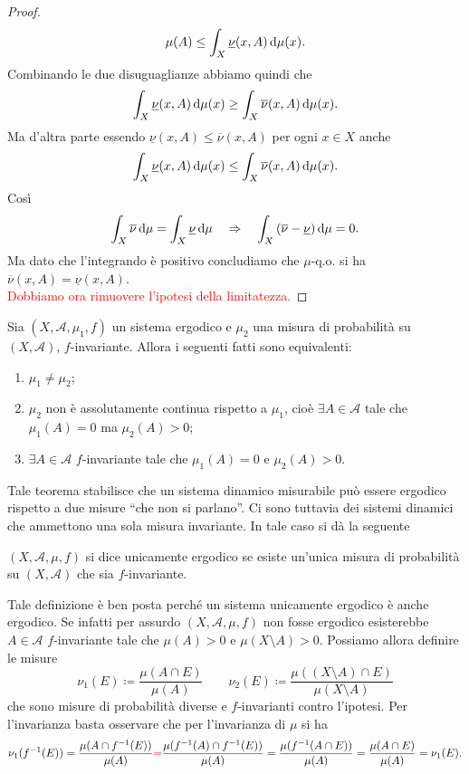 \begin{proof}
    \[
        \mu(A) \leq \int_{X}\underline{\nu}(x, A) \dif{\mu}(x).
    \]
    Combinando le due disuguaglianze abbiamo quindi che
    \[
        \int_{X}\underline{\nu}(x, A) \dif{\mu}(x) \geq \int_{X}\overline{\nu}(x, A) \dif{\mu}(x).
    \]
    Ma d'altra parte essendo $ \underline{\nu}(x, A) \leq \overline{\nu}(x, A) $ per ogni $ x \in X $ anche
    \[
        \int_{X}\underline{\nu}(x, A) \dif{\mu}(x) \leq \int_{X}\overline{\nu}(x, A) \dif{\mu}(x).
    \]
    Così
    \[
        \int_{X} \overline{\nu} \dif{\mu} = \int_{X} \underline{\nu} \dif{\mu} \quad \Rightarrow \quad \int_{X} \left(\overline{\nu} - \underline{\nu}\right) \dif{\mu} = 0.
    \]
    Ma dato che l'integrando è positivo concludiamo che $ \mu $-q.o. si ha $ \overline{\nu}(x, A) = \underline{\nu}(x, A) $. \\
    \textcolor{red}{Dobbiamo ora rimuovere l'ipotesi della limitatezza.}
\end{proof}

\begin{proposition}
    Sia $ (X, \mathcal{A}, \mu_1, f) $ un sistema ergodico e $ \mu_2 $ una misura di probabilità su $ (X, \mathcal{A}) $, $ f $-invariante. Allora i seguenti fatti sono equivalenti:
    \begin{enumerate}[label=(\roman*)]
        \item $ \mu_1 \neq \mu_2 $;
        \item $ \mu_2 $ non è assolutamente continua rispetto a $ \mu_1 $, cioè $ \exists A \in \mathcal{A} $ tale che $ \mu_1(A) = 0 $ ma $ \mu_2(A) > 0 $;
        \item $ \exists A \in \mathcal{A} $ $ f $-invariante tale che $ \mu_1(A) = 0 $ e $ \mu_2(A) > 0 $.
    \end{enumerate}
\end{proposition}

Tale teorema stabilisce che un sistema dinamico misurabile può essere ergodico rispetto a due misure ``che non si parlano''. Ci sono tuttavia dei sistemi dinamici che ammettono una sola misura invariante. In tale caso si dà la seguente
\begin{definition}
    $ (X, \mathcal{A}, \mu, f) $ si dice unicamente ergodico se esiste un'unica misura di probabilità su $ (X, \mathcal{A}) $ che sia $ f $-invariante.
\end{definition}

Tale definizione è ben posta perché un sistema unicamente ergodico è anche ergodico. Se infatti per assurdo $ (X, \mathcal{A}, \mu, f) $ non fosse ergodico esisterebbe $ A \in \mathcal{A} $ $ f $-invariante tale che $ \mu(A) > 0 $ e $ \mu(X \setminus A) > 0 $. Possiamo allora definire le misure
\[
     \nu_1(E) \coloneqq \frac{\mu(A \cap E)}{\mu(A)}
     \qquad
     \nu_2(E) \coloneqq \frac{\mu((X \setminus A) \cap E)}{\mu(X \setminus A)}
\]
che sono misure di probabilità diverse e $ f $-invarianti contro l'ipotesi. Per l'invarianza basta osservare che per l'invarianza di $ \mu $ si ha
\[
    \nu_1(f^{-1}(E)) = \frac{\mu(A \cap f^{-1}(E))}{\mu(A)} \textcolor{red}{=} \frac{\mu(f^{-1}(A) \cap f^{-1}(E))}{\mu(A)} = \frac{\mu(f^{-1}(A \cap E))}{\mu(A)} = \frac{\mu(A \cap E)}{\mu(A)} = \nu_1(E).
\]

